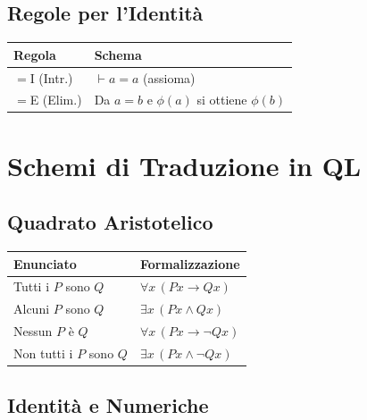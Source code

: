 \documentclass[10pt,a4paper]{article}
\newcommand{\proves}{\vdash}
\begin{document}
\subsection{Regole per l'Identità}

\begin{tabular}{@{}ll@{}}
  \toprule
  \textbf{Regola} & \textbf{Schema} \\
  \midrule
  $=$I (Intr.) & $\proves a = a$ (assioma) \\
  $=$E (Elim.) & Da $a = b$ e $\phi(a)$ si ottiene $\phi(b)$ \\
  \bottomrule
\end{tabular}

\newpage
\section{Schemi di Traduzione in QL}

\subsection{Quadrato Aristotelico}

\begin{tabular}{@{}ll@{}}
  \toprule
  \textbf{Enunciato} & \textbf{Formalizzazione} \\
  \midrule
  Tutti i $P$ sono $Q$ &
    $\forall x\,(Px \to Qx)$ \\
  Alcuni $P$ sono $Q$ &
    $\exists x\,(Px \land Qx)$ \\
  Nessun $P$ è $Q$ &
    $\forall x\,(Px \to \lnot Qx)$ \\
  Non tutti i $P$ sono $Q$ &
    $\exists x\,(Px \land \lnot Qx)$ \\
  \bottomrule
\end{tabular}

\subsection{Identità e Numeriche}
\end{document}
